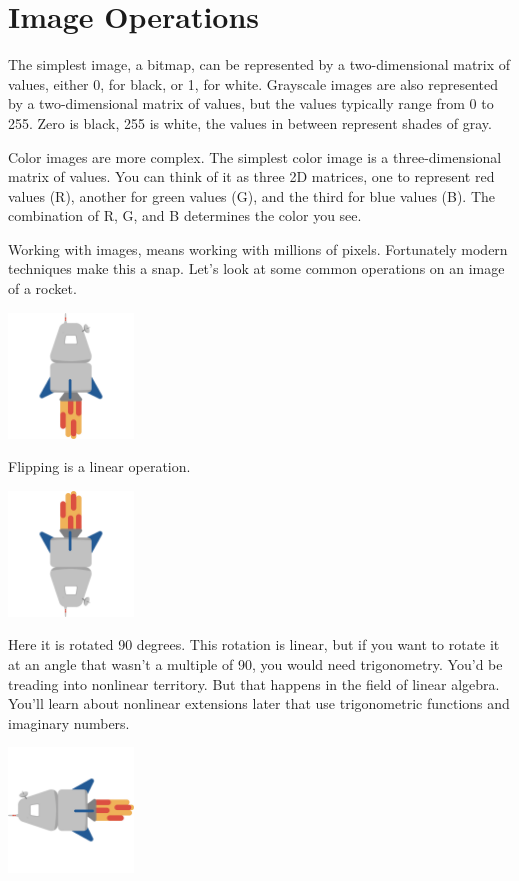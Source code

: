 \section{Image Operations}
The simplest image, a bitmap, can be represented by a two-dimensional matrix of values, either 0, for black, or 1, for white. Grayscale images are also represented by a two-dimensional matrix of values, but the values typically range from 0 to 255. Zero is black, 255 is white, the values in between represent shades of gray. 

Color images are more complex. The simplest color image is a three-dimensional matrix of values. You can think of it as three 2D matrices, one to represent red values (R), another for green values (G), and the third for blue values (B). The combination of R, G, and B determines the color you see.

Working with images, means working with millions of pixels. Fortunately modern techniques make this a snap. Let's look at some common operations on an image of a rocket.

\includegraphics[width=0.25\textwidth]{flying-rocket.png}

Flipping is a linear operation.

\includegraphics[width=0.25\textwidth]{rocket-flipped.png}

Here it is rotated 90 degrees. This rotation is linear, but if you want to rotate it at an angle that wasn't a multiple of 90, you would need trigonometry. You'd be treading into nonlinear territory. But that happens in the field of linear algebra. You'll learn about nonlinear extensions later that use trigonometric functions and imaginary numbers.

\includegraphics[width=0.25\textwidth]{rocket-rotated-90.png}

